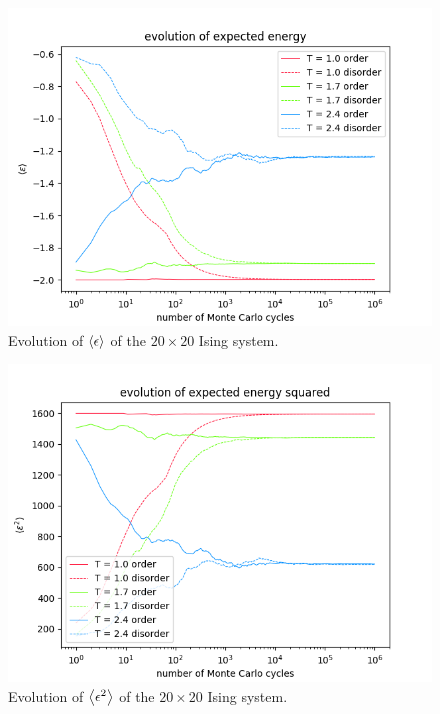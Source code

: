 \documentclass[nofootinbib,reprint,english]{revtex4-1}
\begin{document}
\begin{figure}
\centering
\includegraphics[scale=0.5]{../output/figures/experiment2/energy.png}
\caption{Evolution of \(\expval{\epsilon}\) of the \(20\times20\) Ising system.}\label{fig:experiment2_energy}
\end{figure}

\begin{figure}
\centering
\includegraphics[scale=0.5]{../output/figures/experiment2/energy2.png}
\caption{Evolution of \(\expval{\epsilon^2}\) of the \(20\times20\) Ising system.}\label{fig:experiment2_energy2}
\end{figure}
\end{document}
